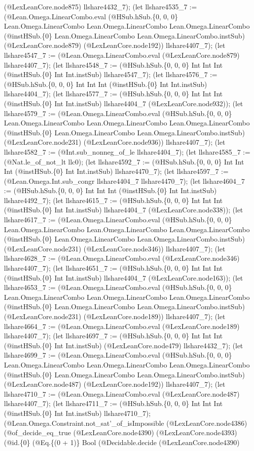 \documentclass[11pt]{article}
\begin{document}
(@LexLeanCore.node875) llshare4432\_7); (let llshare4535\_7 := (@Lean.Omega.LinearCombo.eval (@HSub.hSub.\{0, 0, 0\} Lean.Omega.LinearCombo Lean.Omega.LinearCombo Lean.Omega.LinearCombo (@instHSub.\{0\} Lean.Omega.LinearCombo Lean.Omega.LinearCombo.instSub) (@LexLeanCore.node879) (@LexLeanCore.node192)) llshare4407\_7); (let llshare4547\_7 := (@Lean.Omega.LinearCombo.eval (@LexLeanCore.node879) llshare4407\_7); (let llshare4548\_7 := (@HSub.hSub.\{0, 0, 0\} Int Int Int (@instHSub.\{0\} Int Int.instSub) llshare4547\_7); (let llshare4576\_7 := (@HSub.hSub.\{0, 0, 0\} Int Int Int (@instHSub.\{0\} Int Int.instSub) llshare4404\_7); (let llshare4577\_7 := (@HSub.hSub.\{0, 0, 0\} Int Int Int (@instHSub.\{0\} Int Int.instSub) llshare4404\_7 (@LexLeanCore.node932)); (let llshare4579\_7 := (@Lean.Omega.LinearCombo.eval (@HSub.hSub.\{0, 0, 0\} Lean.Omega.LinearCombo Lean.Omega.LinearCombo Lean.Omega.LinearCombo (@instHSub.\{0\} Lean.Omega.LinearCombo Lean.Omega.LinearCombo.instSub) (@LexLeanCore.node231) (@LexLeanCore.node936)) llshare4407\_7); (let llshare4582\_7 := (@Int.sub\_nonneg\_of\_le llshare4404\_7); (let llshare4585\_7 := (@Nat.le\_of\_not\_lt llc0); (let llshare4592\_7 := (@HSub.hSub.\{0, 0, 0\} Int Int Int (@instHSub.\{0\} Int Int.instSub) llshare4470\_7); (let llshare4597\_7 := (@Lean.Omega.Int.sub\_congr llshare4404\_7 llshare4470\_7); (let llshare4604\_7 := (@HSub.hSub.\{0, 0, 0\} Int Int Int (@instHSub.\{0\} Int Int.instSub) llshare4492\_7); (let llshare4615\_7 := (@HSub.hSub.\{0, 0, 0\} Int Int Int (@instHSub.\{0\} Int Int.instSub) llshare4404\_7 (@LexLeanCore.node338)); (let llshare4617\_7 := (@Lean.Omega.LinearCombo.eval (@HSub.hSub.\{0, 0, 0\} Lean.Omega.LinearCombo Lean.Omega.LinearCombo Lean.Omega.LinearCombo (@instHSub.\{0\} Lean.Omega.LinearCombo Lean.Omega.LinearCombo.instSub) (@LexLeanCore.node231) (@LexLeanCore.node346)) llshare4407\_7); (let llshare4628\_7 := (@Lean.Omega.LinearCombo.eval (@LexLeanCore.node346) llshare4407\_7); (let llshare4651\_7 := (@HSub.hSub.\{0, 0, 0\} Int Int Int (@instHSub.\{0\} Int Int.instSub) llshare4404\_7 (@LexLeanCore.node163)); (let llshare4653\_7 := (@Lean.Omega.LinearCombo.eval (@HSub.hSub.\{0, 0, 0\} Lean.Omega.LinearCombo Lean.Omega.LinearCombo Lean.Omega.LinearCombo (@instHSub.\{0\} Lean.Omega.LinearCombo Lean.Omega.LinearCombo.instSub) (@LexLeanCore.node231) (@LexLeanCore.node189)) llshare4407\_7); (let llshare4664\_7 := (@Lean.Omega.LinearCombo.eval (@LexLeanCore.node189) llshare4407\_7); (let llshare4697\_7 := (@HSub.hSub.\{0, 0, 0\} Int Int Int (@instHSub.\{0\} Int Int.instSub) (@LexLeanCore.node479) llshare4432\_7); (let llshare4699\_7 := (@Lean.Omega.LinearCombo.eval (@HSub.hSub.\{0, 0, 0\} Lean.Omega.LinearCombo Lean.Omega.LinearCombo Lean.Omega.LinearCombo (@instHSub.\{0\} Lean.Omega.LinearCombo Lean.Omega.LinearCombo.instSub) (@LexLeanCore.node487) (@LexLeanCore.node192)) llshare4407\_7); (let llshare4710\_7 := (@Lean.Omega.LinearCombo.eval (@LexLeanCore.node487) llshare4407\_7); (let llshare4711\_7 := (@HSub.hSub.\{0, 0, 0\} Int Int Int (@instHSub.\{0\} Int Int.instSub) llshare4710\_7); (@Lean.Omega.Constraint.not\_sat'\_of\_isImpossible (@LexLeanCore.node4386) (@of\_decide\_eq\_true (@LexLeanCore.node4390) (@LexLeanCore.node4393) (@id.\{0\} (@Eq.\{(0 + 1)\} Bool (@Decidable.decide (@LexLeanCore.node4390) 
\end{document}

